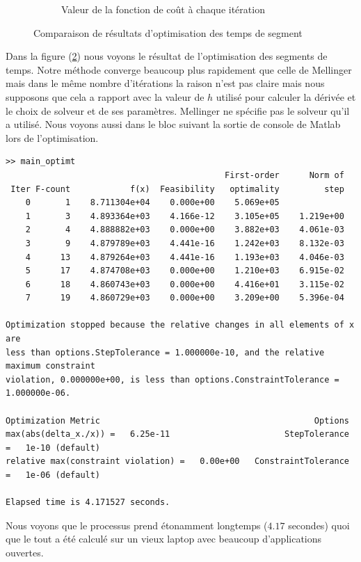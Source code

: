 \begin{figure}[h]
\begin{subfigure}{.5\textwidth}
  \caption{Valeur de la fonction de coût à chaque itération}
  \label{fig:sub2}
\end{subfigure}
\caption{Comparaison de résultats d'optimisation des temps de segment}
\label{fig:comparaison_opt_temps}
\end{figure}


Dans la figure (\ref{fig:comparaison_opt_temps}) nous voyons le résultat de l'optimisation des segments de temps. Notre méthode converge beaucoup plus rapidement que celle de Mellinger mais dans le même nombre d'itérations la raison n'est pas claire mais nous supposons que cela a rapport avec la valeur de $h$ utilisé pour calculer la dérivée et le choix de solveur et de ses paramètres. Mellinger ne spécifie pas le solveur qu'il a utilisé. Nous voyons aussi dans le bloc suivant la sortie de console de Matlab lors de l'optimisation.

\begin{verbatim}
>> main_optimt
                                            First-order      Norm of
 Iter F-count            f(x)  Feasibility   optimality         step
    0       1    8.711304e+04    0.000e+00    5.069e+05
    1       3    4.893364e+03    4.166e-12    3.105e+05    1.219e+00
    2       4    4.888882e+03    0.000e+00    3.882e+03    4.061e-03
    3       9    4.879789e+03    4.441e-16    1.242e+03    8.132e-03
    4      13    4.879264e+03    4.441e-16    1.193e+03    4.046e-03
    5      17    4.874708e+03    0.000e+00    1.210e+03    6.915e-02
    6      18    4.860743e+03    0.000e+00    4.416e+01    3.115e-02
    7      19    4.860729e+03    0.000e+00    3.209e+00    5.396e-04

Optimization stopped because the relative changes in all elements of x are
less than options.StepTolerance = 1.000000e-10, and the relative maximum constraint
violation, 0.000000e+00, is less than options.ConstraintTolerance = 1.000000e-06.

Optimization Metric                                           Options
max(abs(delta_x./x)) =   6.25e-11                       StepTolerance =   1e-10 (default)
relative max(constraint violation) =   0.00e+00   ConstraintTolerance =   1e-06 (default)

Elapsed time is 4.171527 seconds.
\end{verbatim}

Nous voyons que le processus prend étonamment longtemps ($4.17$ secondes) quoi que le tout a été calculé sur un vieux laptop avec beaucoup d'applications ouvertes.

